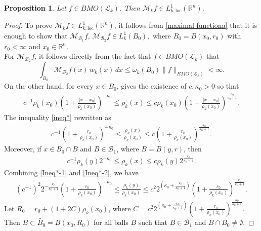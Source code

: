 \documentclass[11pt, reqno]{amsproc}
\newtheorem{proposition}[theorem]{Proposition}
\theoremstyle{definition}
\theoremstyle{remark}
\numberwithin{equation}{section}
\begin{document}
\begin{proposition}
Let $f\in BMO(\mathcal{L}_k)$. Then $\mathcal{M}_kf \in L^1_{k,\text{loc}}(\mathbb{R}^n)$. 
\end{proposition}
\begin{proof}
To prove $\mathcal{M}_kf \in L^1_{k,\text{loc}}(\mathbb{R}^n)$, it follows from \eqref{maximal functiona} that it is enough to show that
\(
\mathcal{M}_{\mathcal{B}_1}f,\,
\mathcal{M}_{\mathcal{B}_2}f \in L_k^1(B_0),
\)
where $B_0 = B(x_0,r_0)$ with $r_0 < \infty$ and $x_0 \in \mathbb{R}^n$.\\

\noindent For $\mathcal{M}_{\mathcal{B}_2}f$, it follows directly from the fact that $f \in BMO(\mathcal{L}_k)$ that
\[
  \int_{B_0} \mathcal{M}_{\mathcal{B}_2}f(x)\,w_k(x)\,dx
  \leq
  \omega_k(B_0)\|f\|_{BMO(\mathcal{L}_k)}
  < \infty.
\]
On the other hand, for every $x\in B_0$,  \cite[Lemma 8 ]{Hejna-2021} gives the existence of $c, \kappa_0>0$ so that
\begin{align} \label{ineq*}
    c^{-1} {\rho_k}(x_0) \left(1+ \frac{|x-x_0|}{{\rho_k}(x_0)} \right)^{-\kappa_0} \leq {\rho_k}(x) \leq c {\rho_k}(x_0) \left(1+ \frac{|x-x_0|}{{\rho_k}(x_0)} \right)^{\frac{\kappa_0}{\kappa_0+1}} .
\end{align} 
The inequality \eqref{ineq*} rewritten as 
\begin{align} \label{Ineq*-1}
    c^{-1}  \left(1+ \frac{r_0}{{\rho_k}(x_0)} \right)^{-\kappa_0} \leq \frac{{\rho_k}(x)}{{\rho_k}(x_0)} \leq c \left(1+ \frac{r_0}{{\rho_k}(x_0)} \right)^{\frac{\kappa_0}{\kappa_0+1}}.
\end{align}
Moreover, if $x\in B_0 \cap B $ and $B\in \mathcal{B}_1$, where $B=B(y, r)$, then 
\begin{align}\label{Ineq*-2}
    c^{-1} {\rho_k}(y) 2^{-\kappa_0} \leq {\rho_k}(x) \leq c {\rho_k}(y)2^{\frac{\kappa_0}{\kappa_0+1}}.
\end{align}
Combining \eqref{Ineq*-1} and \eqref{Ineq*-2}, we have 
\begin{align*}
    (c^{-1})^2 2^{-\frac{\kappa_0}{\kappa_0+1}}\left(1+ \frac{r_0}{{\rho_k}(x_0)} \right)^{-\kappa_0}  \leq  \frac{{\rho_k}(y)}{{\rho_k}(x_0)} \leq  c^2 2^{\left(\kappa_0+\frac{\kappa_0}{\kappa_0+1}\right)} \left(1+ \frac{r_0}{{\rho_k}(x_0)} \right)^{\frac{\kappa_0}{\kappa_0+1}}. 
\end{align*}
Let $R_0=r_0+(1+2C){\rho_k}(x_0)$, where $C=c^2 2^{\left(\kappa_0+\frac{\kappa_0}{\kappa_0+1}\right)} \left(1+ \frac{r_0}{{\rho_k}(x_0)} \right)^{\frac{\kappa_0}{\kappa_0+1}}$. Then $B\subset \widetilde{B_0}=B(x_0, R_0)$ for all balls $B$ such that $B\in \mathcal{B}_1$ and $B\cap B_0 \neq \emptyset$.

\end{proof}
\end{document}
